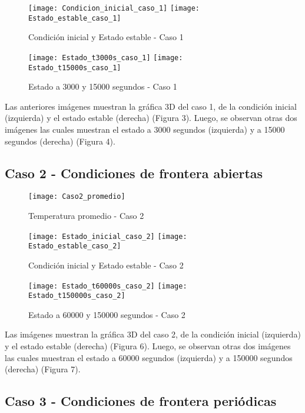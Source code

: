 \documentclass{article}
\begin{document}
\begin{figure}[h!]
\centering
\texttt{[image: Condicion\_inicial\_caso\_1]}
\texttt{[image: Estado\_estable\_caso\_1]}
\caption{Condición inicial y Estado estable - Caso 1}
\label{cond1}
\end{figure}


\begin{figure}[h!]
\centering
\texttt{[image: Estado\_t3000s\_caso\_1]}
\texttt{[image: Estado\_t15000s\_caso\_1]}
\caption{Estado a 3000 y 15000 segundos - Caso 1}
\label{Est3000}
\end{figure}


Las anteriores imágenes muestran la gráfica 3D del caso 1, de la condición inicial (izquierda) y el estado estable (derecha) (Figura 3). Luego, se observan otras dos imágenes las cuales muestran el estado a 3000 segundos (izquierda) y a 15000 segundos (derecha) (Figura 4).


\subsection{Caso 2 - Condiciones de frontera abiertas}

\begin{figure}[h!]
\centering
\texttt{[image: Caso2\_promedio]}
\caption{Temperatura promedio - Caso 2}
\label{temp2}
\end{figure}


\begin{figure}[h!]
\centering
\texttt{[image: Estado\_inicial\_caso\_2]}
\texttt{[image: Estado\_estable\_caso\_2]}
\caption{Condición inicial y Estado estable - Caso 2}
\label{cond2}
\end{figure}

\begin{figure}[h!]
\centering
\texttt{[image: Estado\_t60000s\_caso\_2]}
\texttt{[image: Estado\_t150000s\_caso\_2]}
\caption{Estado a 60000 y 150000 segundos - Caso 2}
\label{Est2}
\end{figure}

\newpage

\vspace{3mm}
Las imágenes muestran la gráfica 3D del caso 2, de la condición inicial (izquierda) y el estado estable (derecha) (Figura 6). Luego, se observan otras dos imágenes las cuales muestran el estado a 60000 segundos (izquierda) y a 150000 segundos (derecha) (Figura 7).


\subsection{Caso 3 - Condiciones de frontera periódicas}
\end{document}

